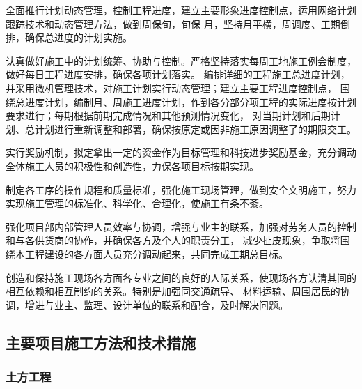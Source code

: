  全面推行计划动态管理，控制工程进度，建立主要形象进度控制点，运用网络计划跟踪技术和动态管理方法，做到周保旬，旬保
月，坚持月平横，周调度、工期倒排，确保总进度的计划实施。

 认真做好施工中的计划统筹、协助与控制。严格坚持落实每周工地施工例会制度，做好每日工程进度安排，确保各项计划落实。
编排详细的工程施工总进度计划，并采用微机管理技术，对施工计划实行动态管理；建立主要工程进度控制点，
围绕总进度计划，编制月、周施工进度计划，作到各分部分项工程的实际进度按计划要求进行；每期根据前期完成情况和其他预测情况变化，
对当期计划和后期计划、总计划进行重新调整和部署，确保按原定或因非施工原因调整了的期限交工。

 实行奖励机制，拟定拿出一定的资金作为目标管理和科技进步奖励基金，充分调动全体施工人员的积极性和创造性，力保各项目标按期实现。

 制定各工序的操作规程和质量标准，强化施工现场管理，做到安全文明施工，努力实现施工管理的标准化、科学化、合理化，使施工有条不紊。

 强化项目部内部管理人员效率与协调，增强与业主的联系，加强对劳务人员的控制和与各供货商的协作，并确保各方及个人的职责分工，
减少扯皮现象，争取将围绕本工程建设的各方面人员充分调动起来，共同完成工期总目标。

 创造和保持施工现场各方面各专业之间的良好的人际关系，使现场各方认清其间的相互依赖和相互制约的关系。特别是加强同交通疏导、
材料运输、周围居民的协调，增进与业主、监理、设计单位的联系和配合，及时解决问题。

\subsection{主要项目施工方法和技术措施}
\subsubsection{土方工程}

